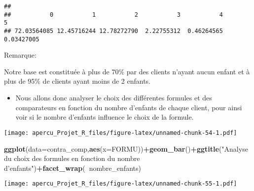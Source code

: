 \documentclass[
]{article}
\newenvironment{Shaded}{\begin{snugshade}}{\end{snugshade}}
\newcommand{\DataTypeTok}[1]{\textcolor[rgb]{0.13,0.29,0.53}{#1}}
\newcommand{\KeywordTok}[1]{\textcolor[rgb]{0.13,0.29,0.53}{\textbf{#1}}}
\newcommand{\NormalTok}[1]{#1}
\newcommand{\OperatorTok}[1]{\textcolor[rgb]{0.81,0.36,0.00}{\textbf{#1}}}
\newcommand{\StringTok}[1]{\textcolor[rgb]{0.31,0.60,0.02}{#1}}
\providecommand{\tightlist}{%
  \setlength{\itemsep}{0pt}\setlength{\parskip}{0pt}}
\begin{document}
\begin{verbatim}
## 
##           0           1           2           3           4           5 
## 72.03564085 12.45716244 12.78272790  2.22755312  0.46264565  0.03427005
\end{verbatim}

Remarque:

Notre base est constituée à plus de 70\% par des clients n'ayant aucun
enfant et à plus de 95\% de clients ayant moins de 2 enfants.

\begin{itemize}
\tightlist
\item
  Nous allons donc analyser le choix des différentes formules et des
  comparateurs en fonction du nombre d'enfants de chaque client, pour
  ainsi voir si le nombre d'enfants influence le choix de la formule.
\end{itemize}

\begin{Shaded}
\end{Shaded}

\texttt{[image: apercu\_Projet\_R\_files/figure-latex/unnamed-chunk-54-1.pdf]}

\begin{Shaded}
\begin{Highlighting}[]
\KeywordTok{ggplot}\NormalTok{(}\DataTypeTok{data=}\NormalTok{contra_comp,}\KeywordTok{aes}\NormalTok{(}\DataTypeTok{x=}\NormalTok{FORMU))}\OperatorTok{+}\KeywordTok{geom_bar}\NormalTok{()}\OperatorTok{+}\KeywordTok{ggtitle}\NormalTok{(}\StringTok{"Analyse du choix des formules en fonction du nombre d'enfants"}\NormalTok{)}\OperatorTok{+}\KeywordTok{facet_wrap}\NormalTok{(}\OperatorTok{~}\NormalTok{nombre_enfants)}
\end{Highlighting}
\end{Shaded}

\texttt{[image: apercu\_Projet\_R\_files/figure-latex/unnamed-chunk-55-1.pdf]}
\end{document}
